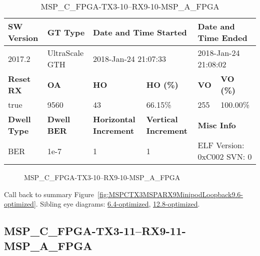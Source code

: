 \begin{table}[h]
\centering
\caption{MSP\_C\_FPGA-TX3-10--RX9-10-MSP\_A\_FPGA}
\label{tab:MSPCFPGATX310RX910MSPAFPGA9.6-optimized}
\begin{tabular}{@{}|l|l|l|l|l|l|@{}}
\toprule
\textbf{SW Version}                & \textbf{GT Type}   & \multicolumn{2}{l|}{\textbf{Date and Time Started}}            & \multicolumn{2}{l|}{\textbf{Date and Time Ended}}        \\ \midrule
2017.2                       & UltraScale GTH          & \multicolumn{2}{l|}{2018-Jan-24 21:07:33}                   & \multicolumn{2}{l|}{2018-Jan-24 21:08:02}               \\ \midrule
\textbf{Reset RX}                  & \textbf{OA} & \textbf{HO}   & \textbf{HO (\%)} & \textbf{VO} & \textbf{VO (\%)} \\ \midrule
true & 9560        & 43          & 66.15\%        & 255        & 100.00\%       \\ \midrule
\textbf{Dwell Type}                & \textbf{Dwell BER} & \textbf{Horizontal Increment} & \textbf{Vertical Increment}    & \multicolumn{2}{l|}{\textbf{Misc Info}}                  \\ \midrule
BER                            & 1e-7        & 1        & 1           & \multicolumn{2}{l|}{ELF Version: 0xC002 SVN: 0}                         \\ \bottomrule
\end{tabular}
\end{table}

\begin{figure}[h]
\caption{MSP\_C\_FPGA-TX3-10--RX9-10-MSP\_A\_FPGA} \label{fig:MSPCFPGATX310RX910MSPAFPGA9.6-optimized}
\end{figure}

Call back to summary Figure~\ref{fig:MSPCTX3MSPARX9MinipodLoopback9.6-optimized}.
Sibling eye diagrams: \hyperref[sec:MSPCFPGATX310RX910MSPAFPGA6.4-optimized]{6.4-optimized}, \hyperref[sec:MSPCFPGATX310RX910MSPAFPGA12.8-optimized]{12.8-optimized}.

\clearpage
\newpage


\subsection{MSP\_C\_FPGA-TX3-11--RX9-11-MSP\_A\_FPGA}\label{sec:MSPCFPGATX311RX911MSPAFPGA9.6-optimized}

